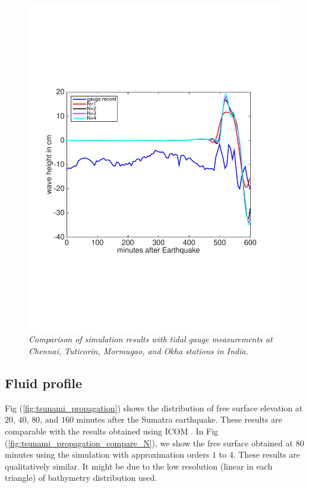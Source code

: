 \begin{figure}
\begin{center}
{\begin{minipage}[c]{0.45\linewidth}
      \includegraphics[trim=0cm 6cm 2cm 7cm,clip=true,width=\textwidth]{./figures/okhaGaugeCon.pdf}
  \end{minipage}}
\end{center}
 \caption{\emph{Comparison of simulation results with tidal gauge measurements at Chennai, Tuticorin, Mormugao, and Okha stations  in India.}}
  \label{fig:gauge_compare}
\end{figure}

\subsection{Fluid profile}
Fig (\ref{fig:tsunami_propagation}) shows the distribution of free surface elevation at $20$, $40$, $80$, and $160$ minutes after the Sumatra earthquake. These results are comparable with the results obtained  using ICOM \cite{pietrzak2007defining}.
In Fig (\ref{fig:tsunami_propagation_compare_N}), we show the free surface obtained at $80$ minutes using the simulation with approximation orders $1$ to $4$. These results are qualitatively similar. It might be due to the low resolution (linear in each triangle) of bathymetry distribution used.

